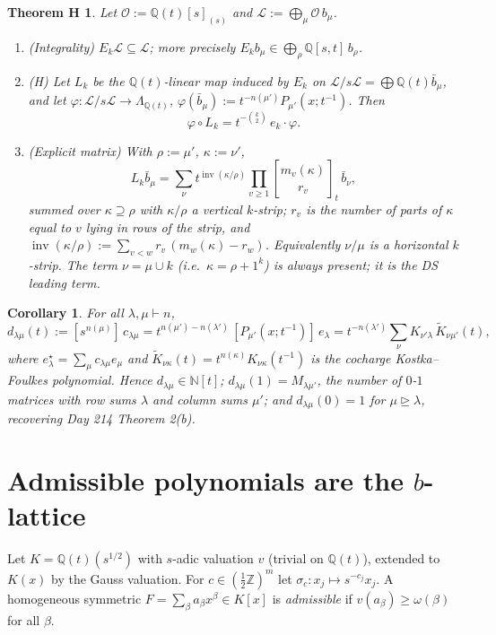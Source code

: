 \documentclass[11pt]{article}
\newtheorem*{theoremH}{Theorem H}
\newtheorem*{corollary}{Corollary}
\theoremstyle{definition}
\newcommand{\Q}{\mathbb{Q}}
\newcommand{\Z}{\mathbb{Z}}
\newcommand{\N}{\mathbb{N}}
\newcommand{\dom}{\trianglerighteq}
\newcommand{\inv}{\operatorname{inv}}
\newcommand{\cO}{\mathcal{O}}
\newcommand{\cL}{\mathcal{L}}
\newcommand{\gbin}[3]{\genfrac{[}{]}{0pt}{}{#1}{#2}_{#3}}
\begin{document}
\begin{theoremH}
Let $\cO:=\Q(t)[s]_{(s)}$ and $\cL:=\bigoplus_\mu\cO\, b_\mu$.
\begin{enumerate}[label=(\arabic*)]
\item \emph{(Integrality)} $E_k\cL\subseteq\cL$; more precisely $E_kb_\mu\in\bigoplus_\rho\Q[s,t]\,b_\rho$.
\item \emph{(H)} Let $L_k$ be the $\Q(t)$-linear map induced by $E_k$ on $\cL/s\cL=\bigoplus\Q(t)\bar b_\mu$, and let $\varphi:\cL/s\cL\to\Lambda_{\Q(t)}$, $\varphi(\bar b_\mu):=t^{-n(\mu')}P_{\mu'}(x;t^{-1})$. Then
\[\varphi\circ L_k=t^{-\binom k2}\,e_k\cdot\varphi.\]
\item \emph{(Explicit matrix)} With $\rho:=\mu'$, $\kappa:=\nu'$,
\[L_k\bar b_\mu=\sum_\nu t^{\inv(\kappa/\rho)}\prod_{v\ge1}\gbin{m_v(\kappa)}{r_v}{t}\,\bar b_\nu,\]
summed over $\kappa\supseteq\rho$ with $\kappa/\rho$ a vertical $k$-strip; $r_v$ is the number of parts of $\kappa$ equal to $v$ lying in rows of the strip, and $\inv(\kappa/\rho):=\sum_{v<w}r_v\,(m_w(\kappa)-r_w)$. Equivalently $\nu/\mu$ is a horizontal $k$-strip. The term $\nu=\mu\cup k$ (i.e.\ $\kappa=\rho+1^k$) is always present; it is the DS leading term.
\end{enumerate}
\end{theoremH}

\begin{corollary}
For all $\lambda,\mu\vdash n$,
\[d_{\lambda\mu}(t):=[s^{n(\mu)}]\,c_{\lambda\mu}=t^{n(\mu')-n(\lambda')}\,[P_{\mu'}(x;t^{-1})]\,e_\lambda=t^{-n(\lambda')}\sum_\nu K_{\nu'\lambda}\,\tilde K_{\nu\mu'}(t),\]
where $e^\star_\lambda=\sum_\mu c_{\lambda\mu}e_\mu$ and $\tilde K_{\nu\kappa}(t)=t^{n(\kappa)}K_{\nu\kappa}(t^{-1})$ is the cocharge Kostka--Foulkes polynomial. Hence $d_{\lambda\mu}\in\N[t]$; $d_{\lambda\mu}(1)=M_{\lambda\mu'}$, the number of $0$-$1$ matrices with row sums $\lambda$ and column sums $\mu'$; and $d_{\lambda\mu}(0)=1$ for $\mu\dom\lambda$, recovering Day 214 Theorem 2(b).
\end{corollary}

\section{Admissible polynomials are the $b$-lattice}

Let $K=\Q(t)(s^{1/2})$ with $s$-adic valuation $v$ (trivial on $\Q(t)$), extended to $K(x)$ by the Gauss valuation. For $c\in(\tfrac12\Z)^m$ let $\sigma_c:x_j\mapsto s^{-c_j}x_j$. A homogeneous symmetric $F=\sum_\beta a_\beta x^\beta\in K[x]$ is \emph{admissible} if $v(a_\beta)\ge\omega(\beta)$ for all $\beta$.
\end{document}
